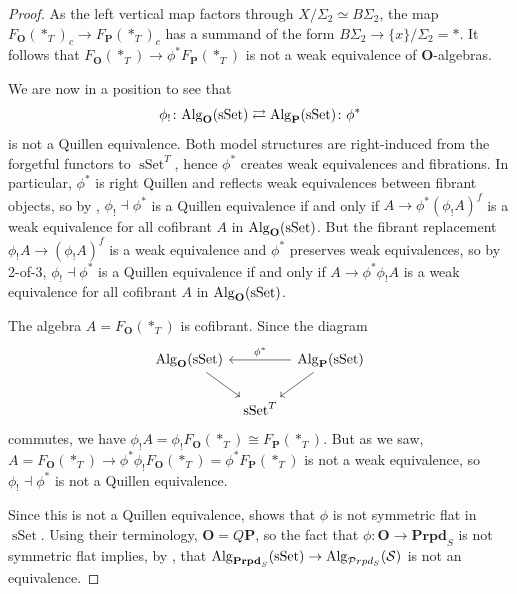 \documentclass{amsart}
\numberwithin{theorem}{subsection}
\theoremstyle{definition}
\newcommand{\xsSet}{\operatorname{sSet}}
\newcommand{\xS}{\mathcal{S}}
\newcommand{\name}[1]{\ensuremath{\text{\textup{#1}}}}
\newcommand{\Alg}{\name{Alg}}
\newcommand{\calproperad}{\mathcal{P}rpd}
\begin{document}
\begin{proof}
As the left vertical map factors through $X / \Sigma_2 \simeq B\Sigma_2$, the map $F_{\mathbf{O}}(\ast_T)_c \to F_{\mathbf{P}}(\ast_T)_c$ has a summand of the form $B\Sigma_2 \to \{x\} / \Sigma_2 = \ast$.
It follows that $F_{\mathbf{O}}(\ast_T) \to \phi^*F_{\mathbf{P}}(\ast_T)$ is not a weak equivalence of $\mathbf{O}$-algebras.

We are now in a position to see that 
\[
\phi_! \colon \Alg_{\mathbf{O}}(\xsSet) \rightleftarrows \Alg_{\mathbf{P}}(\xsSet) \colon \phi^*
\]
is not a Quillen equivalence.
Both model structures are right-induced from the forgetful functors to $\xsSet^T$, hence $\phi^*$ creates weak equivalences and fibrations.
In particular, $\phi^*$ is right Quillen and reflects weak equivalences between fibrant objects, so by \cite[Corollary 1.3.16]{Hovey:MC}, $\phi_! \dashv \phi^*$ is a Quillen equivalence if and only if $A \to \phi^* (\phi_!A)^f$ is a weak equivalence for all cofibrant $A$ in $\Alg_{\mathbf{O}}(\xsSet)$.
But the fibrant replacement $\phi_!A \to (\phi_!A)^f$ is a weak equivalence and $\phi^*$ preserves weak equivalences, so by 2-of-3, $\phi_! \dashv \phi^*$ is a Quillen equivalence if and only if $A \to \phi^*\phi_!A$ is a weak equivalence for all cofibrant $A$ in $\Alg_{\mathbf{O}}(\xsSet)$.

The algebra $A = F_{\mathbf{O}}(\ast_T)$ is cofibrant.
Since the diagram
\[ \begin{tikzcd}[column sep=tiny]
\Alg_{\mathbf{O}}(\xsSet)\arrow[dr] & & \arrow[ll, "\phi^*" swap] \Alg_{\mathbf{P}}(\xsSet) \arrow[dl]\\
& \xsSet^T
\end{tikzcd} \]
commutes, we have $\phi_!A = \phi_! F_{\mathbf{O}}(\ast_T) \cong F_{\mathbf{P}}(\ast_T)$.
But as we saw, $A = F_{\mathbf{O}}(\ast_T) \to \phi^* \phi_! F_{\mathbf{O}}(\ast_T) = \phi^* F_{\mathbf{P}}(\ast_T) $ is not a weak equivalence, so $\phi_! \dashv \phi^*$ is not a Quillen equivalence.

Since this is not a Quillen equivalence, \cite[Theorem 7.5]{PavlovScholbach} shows that $\phi$ is not symmetric flat in $\xsSet$.
Using their terminology, $\mathbf{O} = Q\mathbf{P}$, so the fact that $\phi \colon \mathbf{O} \to \mathbf{Prpd}_S$ is not symmetric flat implies, by \cite[Theorem 7.11]{PavlovScholbach},
that $\Alg_{\mathbf{Prpd}_S}(\xsSet)\to \Alg_{\calproperad_S}(\xS)$ is not an equivalence.
\end{proof}
\end{document}
